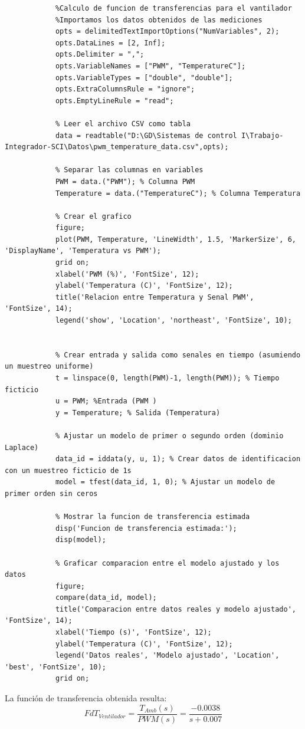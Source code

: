 \documentclass[12pt]{article}
\begin{document}
		\begin{lstlisting}
			%Calculo de funcion de transferencias para el vantilador
			%Importamos los datos obtenidos de las mediciones
			opts = delimitedTextImportOptions("NumVariables", 2);
			opts.DataLines = [2, Inf];
			opts.Delimiter = ",";
			opts.VariableNames = ["PWM", "TemperatureC"];
			opts.VariableTypes = ["double", "double"];
			opts.ExtraColumnsRule = "ignore";
			opts.EmptyLineRule = "read";
			
			% Leer el archivo CSV como tabla
			data = readtable("D:\GD\Sistemas de control I\Trabajo-Integrador-SCI\Datos\pwm_temperature_data.csv",opts);
			
			% Separar las columnas en variables
			PWM = data.("PWM"); % Columna PWM
			Temperature = data.("TemperatureC"); % Columna Temperatura
			
			% Crear el grafico
			figure;
			plot(PWM, Temperature, 'LineWidth', 1.5, 'MarkerSize', 6, 'DisplayName', 'Temperatura vs PWM');
			grid on;
			xlabel('PWM (%)', 'FontSize', 12);
			ylabel('Temperatura (C)', 'FontSize', 12);
			title('Relacion entre Temperatura y Senal PWM', 'FontSize', 14);
			legend('show', 'Location', 'northeast', 'FontSize', 10);
			
			
			% Crear entrada y salida como senales en tiempo (asumiendo un muestreo uniforme)
			t = linspace(0, length(PWM)-1, length(PWM)); % Tiempo ficticio
			u = PWM; %Entrada (PWM )
			y = Temperature; % Salida (Temperatura)
			
			% Ajustar un modelo de primer o segundo orden (dominio Laplace)
			data_id = iddata(y, u, 1); % Crear datos de identificacion con un muestreo ficticio de 1s
			model = tfest(data_id, 1, 0); % Ajustar un modelo de primer orden sin ceros
			
			% Mostrar la funcion de transferencia estimada
			disp('Funcion de transferencia estimada:');
			disp(model);
			
			% Graficar comparacion entre el modelo ajustado y los datos
			figure;
			compare(data_id, model);
			title('Comparacion entre datos reales y modelo ajustado', 'FontSize', 14);
			xlabel('Tiempo (s)', 'FontSize', 12);
			ylabel('Temperatura (C)', 'FontSize', 12);
			legend('Datos reales', 'Modelo ajustado', 'Location', 'best', 'FontSize', 10);
			grid on;
		\end{lstlisting}
		
		La función de transferencia obtenida resulta:
		\begin{equation}
			FdT_{Ventilador}=\frac{T_{Amb}(s)}{PWM(s)}=\frac{-0.0038}{s+0.007}
		\end{equation}
		
\end{document}
